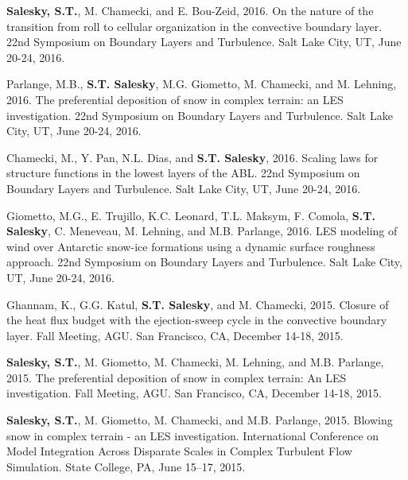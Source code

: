 \documentclass[11pt,letterpaper]{article}
\begin{document}



\textbf{Salesky, S.T.}, M. Chamecki, and E. Bou-Zeid, 2016. On the nature of the
transition from roll to cellular organization in the convective boundary layer.
22nd Symposium on Boundary Layers and Turbulence. Salt Lake City, UT, June
20-24, 2016.

Parlange, M.B., \textbf{S.T. Salesky}, M.G. Giometto, M. Chamecki, and M.
Lehning, 2016.  The preferential deposition of snow in complex terrain: an LES
investigation.  22nd Symposium on Boundary Layers and Turbulence. Salt Lake
City, UT, June 20-24, 2016.

Chamecki, M., Y. Pan, N.L. Dias, and \textbf{S.T. Salesky}, 2016. Scaling laws for
structure functions in the lowest layers of the ABL.  22nd Symposium on
Boundary Layers and Turbulence. Salt Lake City, UT, June 20-24, 2016.

Giometto, M.G., E. Trujillo, K.C. Leonard, T.L. Maksym, F. Comola, \textbf{S.T.
  Salesky}, C. Meneveau, M. Lehning, and M.B. Parlange, 2016.  LES modeling of
wind over Antarctic snow-ice formations using a dynamic surface roughness
approach.  22nd Symposium on Boundary Layers and Turbulence. Salt Lake City,
UT, June 20-24, 2016.

Ghannam, K., G.G. Katul, \textbf{S.T. Salesky}, and M. Chamecki, 2015. Closure
of the heat flux budget with the ejection-sweep cycle in the convective
boundary layer. Fall Meeting, AGU. San Francisco, CA, December 14-18, 2015.

\textbf{Salesky, S.T.}, M. Giometto, M. Chamecki, M. Lehning, and M.B.
Parlange, 2015. The preferential deposition of snow in complex terrain: An LES
investigation. Fall Meeting, AGU. San Francisco, CA, December 14-18, 2015.

\textbf{Salesky, S.T.}, M. Giometto, M. Chamecki, and M.B. Parlange, 2015.
Blowing snow in complex terrain - an LES investigation. International
Conference on Model Integration Across Disparate Scales in Complex Turbulent
Flow Simulation. State College, PA, June 15--17, 2015. 
\end{document}
